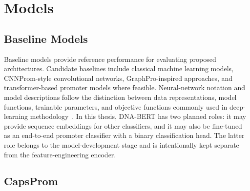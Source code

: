 \chapter{Models}\label{chap:models}

\section{Baseline Models}\label{sec:models-baselines}

Baseline models provide reference performance for evaluating proposed
architectures. Candidate baselines include classical machine learning models,
CNNProm-style convolutional networks, GraphPro-inspired approaches, and
transformer-based promoter models where feasible. Neural-network notation and
model descriptions follow the distinction between data representations, model
functions, trainable parameters, and objective functions commonly used in
deep-learning methodology~\citep{goodfellow2016deep}. In this thesis, DNA-BERT has
two planned roles: it may provide sequence embeddings for other classifiers, and
it may also be fine-tuned as an end-to-end promoter classifier with a binary
classification head. The latter role belongs to the model-development stage and
is intentionally kept separate from the feature-engineering encoder.

\section{CapsProm}\label{sec:models-capsprom}

